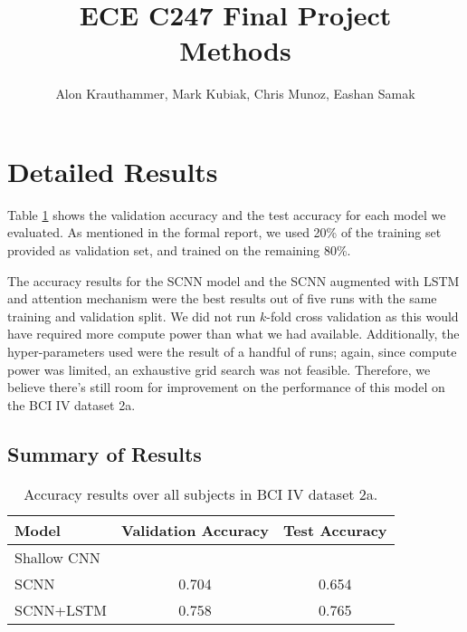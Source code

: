 \documentclass{article}
\author{Alon Krauthammer, Mark Kubiak, Chris Munoz, Eashan Samak}
\title{ECE C247 Final Project\\
Methods}
\begin{document}
\maketitle

\section{Detailed Results}
Table \ref{tab:acc} shows the validation accuracy and the test accuracy for each
model we evaluated. As mentioned in the formal report, we used 20\% of the
training set provided as validation set, and trained on the remaining 80\%.

The accuracy results for the SCNN model and the SCNN augmented with LSTM and
attention mechanism were the best results out of five runs with the same
training and validation split.
We did not run $k$-fold cross validation as this would have required more
compute power than what we had available. Additionally, the hyper-parameters
used were the result of a handful of runs; again, since compute power was
limited, an exhaustive grid search was not feasible. Therefore, we believe
there's still room for improvement on the performance of this model on the BCI
IV dataset 2a. 

\subsection{Summary of Results}
\begin{table}[ht]
\begin{center}
\begin{tabular}{|l|c|c|}
\hline
Model           & Validation Accuracy & Test Accuracy   \\
\hline\hline
Shallow CNN     &                     &                 \\
SCNN            & 0.704               & 0.654           \\
SCNN+LSTM       & 0.758               & 0.765           \\
\hline
\end{tabular}
\end{center}
\caption{Accuracy results over all subjects in BCI IV dataset 2a.}
\label{tab:acc}
\end{table}
\end{document}
